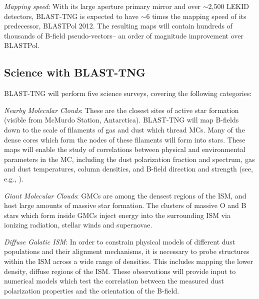 {\vspace{5mm}

\textit{Mapping speed}: With its large aperture primary mirror and over $\sim$2,500 LEKID detectors, BLAST-TNG is expected to have $\sim$6 times the mapping speed of its predecessor, BLASTPol 2012. The resulting maps will contain hundreds of thousands of B-field pseudo-vectors-- an order of magnitude improvement over BLASTPol.

\subsection{Science with BLAST-TNG}

BLAST-TNG will perform five science surveys, covering the following categories:

\vspace{5mm}

\textit{Nearby Molecular Clouds}: These are the closest sites of active star formation (visible from McMurdo Station, Antarctica). BLAST-TNG will map B-fields down to the scale of filaments of gas and dust which thread MCs. Many of the dense cores which form the nodes of these filaments will form into stars. These maps will enable the study of correlations between physical and environmental parameters in the MC, including the dust polarization fraction and spectrum, gas and dust temperatures, column densities, and B-field direction and strength (see, e.g., \citet{galitzki2014balloon,fissel2016balloon,fissel2018relative,shariff2019submillimeter,gandilo2016submillimeter}).

\vspace{5mm}

\textit{Giant Molecular Clouds}: GMCs are among the densest regions of the ISM, and host large amounts of massive star formation. The clusters of massive O and B stars which form inside GMCs inject energy into the surrounding ISM via ionizing radiation, stellar winds and supernovae.
\vspace{5mm}

\textit{Diffuse Galatic ISM}: In order to constrain physical models of different dust populations and their alignment mechanisms, it is necessary to probe structures within the ISM across a wide range of densities. This includes mapping the lower density, diffuse regions of the ISM. These observations will provide input to numerical models which test the correlation between the measured dust polarization properties and the orientation of the B-field.

}
